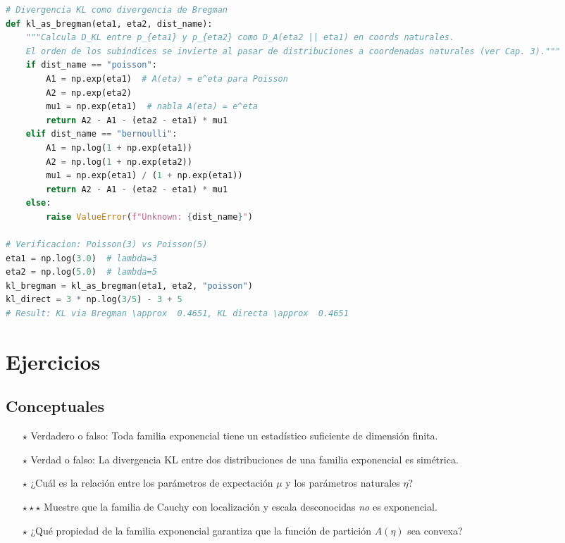 \begin{lstlisting}[language=Python, style=PythonStyle]
# Divergencia KL como divergencia de Bregman
def kl_as_bregman(eta1, eta2, dist_name):
	"""Calcula D_KL entre p_{eta1} y p_{eta2} como D_A(eta2 || eta1) en coords naturales.
	El orden de los subíndices se invierte al pasar de distribuciones a coordenadas naturales (ver Cap. 3)."""
	if dist_name == "poisson":
		A1 = np.exp(eta1)  # A(eta) = e^eta para Poisson
		A2 = np.exp(eta2)
		mu1 = np.exp(eta1)  # nabla A(eta) = e^eta
		return A2 - A1 - (eta2 - eta1) * mu1
	elif dist_name == "bernoulli":
		A1 = np.log(1 + np.exp(eta1))
		A2 = np.log(1 + np.exp(eta2))
		mu1 = np.exp(eta1) / (1 + np.exp(eta1))
		return A2 - A1 - (eta2 - eta1) * mu1
	else:
		raise ValueError(f"Unknown: {dist_name}")

# Verificacion: Poisson(3) vs Poisson(5)
eta1 = np.log(3.0)  # lambda=3
eta2 = np.log(5.0)  # lambda=5
kl_bregman = kl_as_bregman(eta1, eta2, "poisson")
kl_direct = 3 * np.log(3/5) - 3 + 5
# Result: KL via Bregman \approx  0.4651, KL directa \approx  0.4651
\end{lstlisting}

\section{Ejercicios}

\subsection*{Conceptuales}
\begin{enumerate}
	\item[$\star$] Verdadero o falso: Toda familia exponencial tiene un estadístico suficiente de dimensión finita.
	\item[$\star$] Verdad o falso: La divergencia KL entre dos distribuciones de una familia exponencial es simétrica.
	\item[$\star$] ¿Cuál es la relación entre los parámetros de expectación $\mu$ y los parámetros naturales $\eta$?
	\item[$\star\star\star$] Muestre que la familia de Cauchy con localización y escala desconocidas \emph{no} es exponencial.
	\item[$\star$] ¿Qué propiedad de la familia exponencial garantiza que la función de partición $A(\eta)$ sea convexa?
\end{enumerate}

